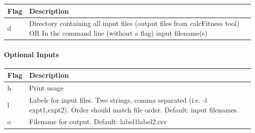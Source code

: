 \documentclass[11pt,]{article}
\let\oldparagraph\paragraph
\renewcommand{\paragraph}[1]{\oldparagraph{#1}\mbox{}}
\begin{document}
\begin{longtable}[]{@{}ll@{}}
\toprule
\begin{minipage}[b]{0.05\columnwidth}\raggedright\strut
Flag\strut
\end{minipage} & \begin{minipage}[b]{0.89\columnwidth}\raggedright\strut
Description\strut
\end{minipage}\tabularnewline
\midrule
\endhead
\begin{minipage}[t]{0.05\columnwidth}\raggedright\strut
d\strut
\end{minipage} & \begin{minipage}[t]{0.89\columnwidth}\raggedright\strut
Directory containing all input files (output files from calcFitness
tool) OR In the command line (without a flag) input filename(s)\strut
\end{minipage}\tabularnewline
\bottomrule
\end{longtable}

\paragraph{Optional Inputs}\label{optional-inputs-6}

\begin{longtable}[]{@{}ll@{}}
\toprule
\begin{minipage}[b]{0.06\columnwidth}\raggedright\strut
Flag\strut
\end{minipage} & \begin{minipage}[b]{0.88\columnwidth}\raggedright\strut
Description\strut
\end{minipage}\tabularnewline
\midrule
\endhead
\begin{minipage}[t]{0.06\columnwidth}\raggedright\strut
h\strut
\end{minipage} & \begin{minipage}[t]{0.88\columnwidth}\raggedright\strut
Print usage\strut
\end{minipage}\tabularnewline
\begin{minipage}[t]{0.06\columnwidth}\raggedright\strut
l\strut
\end{minipage} & \begin{minipage}[t]{0.88\columnwidth}\raggedright\strut
Labels for input files. Two strings, comma separated (i.e. -l
expt1,expt2). Order should match file order. Default: input
filenames.\strut
\end{minipage}\tabularnewline
\begin{minipage}[t]{0.06\columnwidth}\raggedright\strut
o\strut
\end{minipage} & \begin{minipage}[t]{0.88\columnwidth}\raggedright\strut
Filename for output. Default: label1label2.csv\strut
\end{minipage}\tabularnewline
\bottomrule
\end{longtable}
\end{document}
